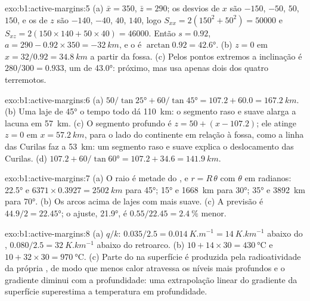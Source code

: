 \begin{solution}{exo:b1:active-margins:5}
(a) $\bar x = 350$, $\bar z = 290$; os desvios de $x$ são $-150$, $-50$,
$50$, $150$, e os de $z$ são $-140$, $-40$, $40$, $140$, logo
$S_{xx} = 2(150^2 + 50^2) = \num{50000}$ e
$S_{xz} = 2(150\times140 + 50\times40) = \num{46000}$. Então $s = 0.92$,
$a = 290 - 0.92\times350 = \qty{-32}{km}$, e o  é
$\arctan 0.92 = \ang{42.6}$. (b) $z = 0$ em $x = 32/0.92 = \qty{34.8}{km}$
a partir da fossa. (c) Pelos pontos extremos a inclinação é $280/300 = 0.933$, um
 de \ang{43.0}: próximo, mas usa apenas dois dos quatro terremotos.
\end{solution}

\begin{solution}{exo:b1:active-margins:6}
(a) $50/\tan\ang{25} + 60/\tan\ang{45} = 107.2 + 60.0 = \qty{167.2}{km}$.
(b) Uma laje de \ang{45} o tempo todo dá \qty{110}{km}: o segmento raso e suave alarga a lacuna em \qty{57}{km}. (c) O segmento profundo é
$z = 50 + (x - 107.2)$; ele atinge $z = 0$ em $x = \qty{57.2}{km}$, para o lado do continente em relação à fossa, como a linha das Curilas faz a \qty{53}{km}: um segmento raso e suave explica o deslocamento das Curilas. (d) $107.2 + 60/\tan\ang{60} = 107.2 + 34.6 =
\qty{141.9}{km}$.
\end{solution}

\begin{solution}{exo:b1:active-margins:7}
(a) O raio é metade do , e $r = R\,\theta$ com $\theta$ em radianos:
\ang{22.5} e $6371\times0.3927 = \qty{2502}{km}$ para \ang{45}; \ang{15} e
\qty{1668}{km} para \ang{30}; \ang{35} e \qty{3892}{km} para \ang{70}.
(b) Os arcos acima de lajes com  mais suave. (c) A previsão é
$44.9/2 = \ang{22.45}$; o ajuste, \ang{21.9}, é
$0.55/22.45 = \qty{2.4}{\percent}$ menor.
\end{solution}

\begin{solution}{exo:b1:active-margins:8}
(a) $q/k$: $0.035/2.5 = \qty{0.014}{K.m^{-1}} = \qty{14}{K.km^{-1}}$ abaixo
do , $0.080/2.5 = \qty{32}{K.km^{-1}}$ abaixo do retroarco.
(b) $10 + 14\times30 = \qty{430}{\celsius}$ e
$10 + 32\times30 = \qty{970}{\celsius}$. (c) Parte do  na superfície é produzida pela radioatividade da própria , de modo que menos calor atravessa os níveis mais profundos e o gradiente diminui com a profundidade: uma extrapolação linear do gradiente da superfície superestima a temperatura em profundidade.
\end{solution}


